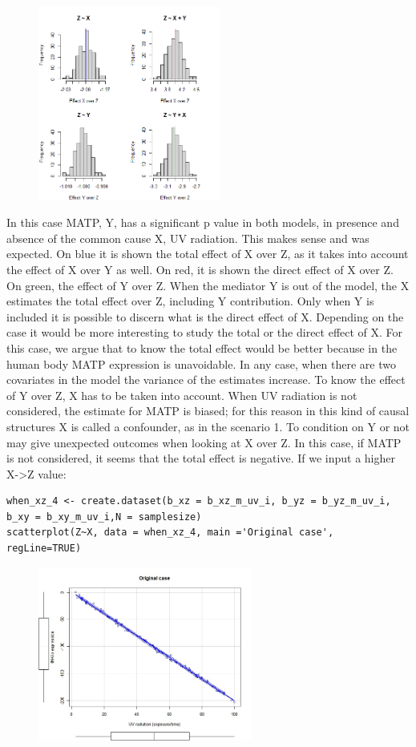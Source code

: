 \documentclass{article}
\begin{document}
\begin{figure}[h]
\includegraphics[width=6cm]{histsc2.png}
\centering
\end{figure}

In this case MATP, Y, has a significant p value in both models, in presence and absence of the common cause X, UV radiation. This makes sense and was expected.
On blue it is shown the total effect of X over Z, as it takes into account the effect of X over Y as well. On red, it is shown the direct effect of X over Z. On green, the effect of Y over Z. 
When the mediator Y is out of the model, the X estimates the total effect over Z, including Y contribution. Only when Y is included it is possible to discern what is the direct effect of X. Depending on the case it would be more interesting to study the total or the direct effect of X. For this case, we argue that to know the total effect would be better because in the human body MATP expression is unavoidable. In any case, when there are two covariates in the model the variance of the estimates increase.
To know the effect of Y over Z, X has to be taken into account. When UV radiation is not considered, the estimate for MATP is biased; for this reason in this kind of causal structures X is called a confounder, as in the scenario 1. 
To condition on Y or not may give unexpected outcomes when looking at X over Z. In this case, if MATP is not considered, it seems that the total effect is negative.
If we input a higher X->Z value:
\begin{lstlisting}
when_xz_4 <- create.dataset(b_xz = b_xz_m_uv_i, b_yz = b_yz_m_uv_i, b_xy = b_xy_m_uv_i,N = samplesize)
scatterplot(Z~X, data = when_xz_4, main ='Original case', regLine=TRUE)
\end{lstlisting}
\begin{figure}[h]
\includegraphics[width=7cm]{scatterplotOriginal.jpeg}
\centering
\end{figure}
\end{document}
